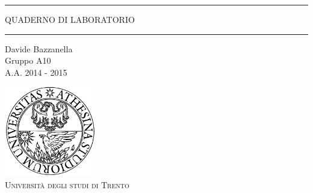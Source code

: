 \begin{titlepage}
\begin{center}

	\hrule \vspace{0.5cm}
     	\textsc{\LARGE QUADERNO DI LABORATORIO}
	\vspace{0.5cm} \hrule \vspace{2cm}

      	{\large Davide Bazzanella\\
		Gruppo A10}\\
	\vspace{0.5cm}
      	{\large A.A. 2014 - 2015}
	\vfill

	\includegraphics[width=4cm]{unitn_logo.png}\\
	\vspace{1cm}
        \textsc{\Large Università degli studi di Trento}
	\vfill


\end{center}
\end{titlepage}
